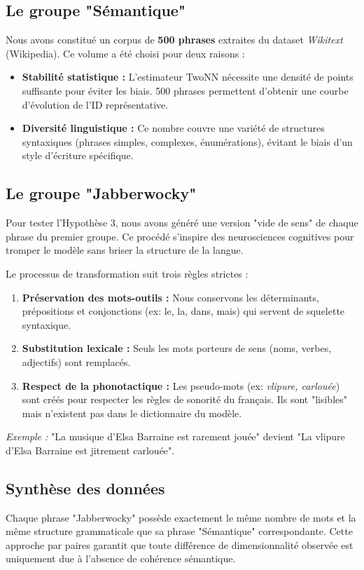 \subsection{Le groupe "Sémantique"}
Nous avons constitué un corpus de \textbf{500 phrases} extraites du dataset \textit{Wikitext} (Wikipedia). Ce volume a été choisi pour deux raisons :
\begin{itemize}
    \item \textbf{Stabilité statistique :} L'estimateur TwoNN nécessite une densité de points suffisante pour éviter les biais. 500 phrases permettent d'obtenir une courbe d'évolution de l'ID représentative.
    \item \textbf{Diversité linguistique :} Ce nombre couvre une variété de structures syntaxiques (phrases simples, complexes, énumérations), évitant le biais d'un style d'écriture spécifique.
\end{itemize}

\subsection{Le groupe "Jabberwocky"}
Pour tester l'Hypothèse 3, nous avons généré une version "vide de sens" de chaque phrase du premier groupe. Ce procédé s'inspire des neurosciences cognitives pour tromper le modèle sans briser la structure de la langue.

Le processus de transformation suit trois règles strictes :
\begin{enumerate}
    \item \textbf{Préservation des mots-outils :} Nous conservons les déterminants, prépositions et conjonctions (ex: le, la, dans, mais) qui servent de squelette syntaxique.
    \item \textbf{Substitution lexicale :} Seuls les mots porteurs de sens (noms, verbes, adjectifs) sont remplacés.
    \item \textbf{Respect de la phonotactique :} Les pseudo-mots (ex: \textit{vlipure, carlouée}) sont créés pour respecter les règles de sonorité du français. Ils sont "lisibles" mais n'existent pas dans le dictionnaire du modèle.
\end{enumerate}

\textit{Exemple :} "La musique d'Elsa Barraine est rarement jouée" devient "La vlipure d'Elsa Barraine est jitrement carlouée".

\subsection{Synthèse des données}
Chaque phrase "Jabberwocky" possède exactement le même nombre de mots et la même structure grammaticale que sa phrase "Sémantique" correspondante. Cette approche par paires garantit que toute différence de dimensionnalité observée est uniquement due à l'absence de cohérence sémantique.


